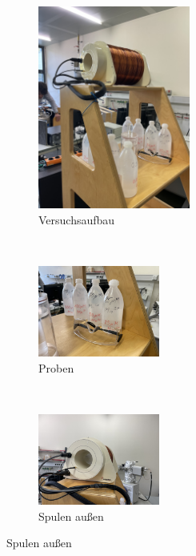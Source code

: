 \documentclass[../main.tex]{subfiles}
\begin{document}
    \begin{figure}[H]
        \centering
        \begin{subfigure}[b]{0.32\textwidth}
            \centering
            \includegraphics[width=5cm,angle=270]{Bilddateien/1B3CD638-A034-4302-B2E8-81D900DB3547.jpeg}
            \caption{Versuchsaufbau}
            \label{fig:Versuchsaufbau}
        \end{subfigure}
        \
        \begin{subfigure}[b]{0.32\textwidth}
            \centering
            \includegraphics[width=4cm,angle=180]{Bilddateien/2D6634FA-11FA-4A5E-9C13-93C4F30340D7.jpeg}
            \caption{Proben}
            \label{fig:Proben}
        \end{subfigure}
        \
        \begin{subfigure}[b]{0.32\textwidth}
            \centering
            \includegraphics[width=4cm,angle=180]{Bilddateien/4D7C3F5A-8634-4ED8-802E-E878DEABC504.jpeg}
            \caption{Spulen außen}
            \label{fig:SpulenAussen}
        \end{subfigure}
    \end{figure}
\end{document}
